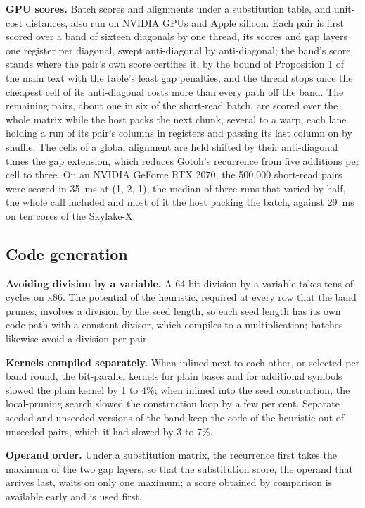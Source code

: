 \documentclass[10pt]{article}
\begin{document}
\textbf{GPU scores.} Batch scores and alignments under a substitution table, and unit-cost distances, also run on NVIDIA GPUs and Apple silicon. Each pair is first scored over a band of sixteen diagonals by one thread, its scores and gap layers one register per diagonal, swept anti-diagonal by anti-diagonal; the band's score stands where the pair's own score certifies it, by the bound of Proposition 1 of the main text with the table's least gap penalties, and the thread stops once the cheapest cell of its anti-diagonal costs more than every path off the band. The remaining pairs, about one in six of the short-read batch, are scored over the whole matrix while the host packs the next chunk, several to a warp, each lane holding a run of its pair's columns in registers and passing its last column on by shuffle. The cells of a global alignment are held shifted by their anti-diagonal times the gap extension, which reduces Gotoh's recurrence from five additions per cell to three. On an NVIDIA GeForce RTX 2070, the 500{,}000 short-read pairs were scored in 35~ms at (1, 2, 1), the median of three runs that varied by half, the whole call included and most of it the host packing the batch, against 29~ms on ten cores of the Skylake-X.

\subsection{Code generation}

\textbf{Avoiding division by a variable.} A 64-bit division by a variable takes tens of cycles on x86. The potential of the heuristic, required at every row that the band prunes, involves a division by the seed length, so each seed length has its own code path with a constant divisor, which compiles to a multiplication; batches likewise avoid a division per pair.

\textbf{Kernels compiled separately.} When inlined next to each other, or selected per band round, the bit-parallel kernels for plain bases and for additional symbols slowed the plain kernel by 1 to 4\%; when inlined into the seed construction, the local-pruning search slowed the construction loop by a few per cent. Separate seeded and unseeded versions of the band keep the code of the heuristic out of unseeded pairs, which it had slowed by 3 to 7\%.

\textbf{Operand order.} Under a substitution matrix, the recurrence first takes the maximum of the two gap layers, so that the substitution score, the operand that arrives last, waits on only one maximum; a score obtained by comparison is available early and is used first.
\end{document}
